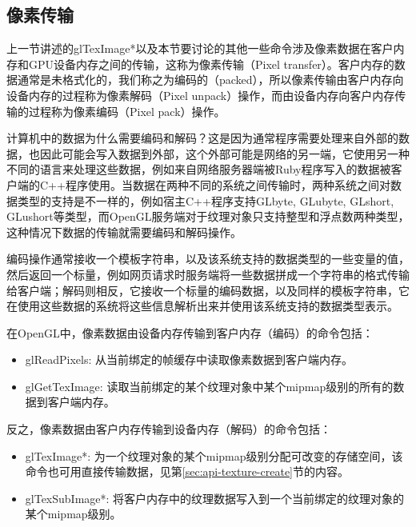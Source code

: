 \subsection{像素传输}
上一节讲述的glTexImage*以及本节要讨论的其他一些命令涉及像素数据在客户内存和GPU设备内存之间的传输，这称为像素传输（Pixel transfer）。客户内存的数据通常是未格式化的，我们称之为编码的（packed），所以像素传输由客户内存向设备内存的过程称为像素解码（Pixel unpack）操作，而由设备内存向客户内存传输的过程称为像素编码（Pixel pack）操作。

\begin{myshaded}
	计算机中的数据为什么需要编码和解码？这是因为通常程序需要处理来自外部的数据，也因此可能会写入数据到外部，这个外部可能是网络的另一端，它使用另一种不同的语言来处理这些数据，例如来自网络服务器端被Ruby程序写入的数据被客户端的C++程序使用。当数据在两种不同的系统之间传输时，两种系统之间对数据类型的支持是不一样的，例如宿主C++程序支持GLbyte, GLubyte, GLshort, GLushort等类型，而OpenGL服务端对于纹理对象只支持整型和浮点数两种类型，这种情况下数据的传输就需要编码和解码操作。
	
	编码操作通常接收一个模板字符串，以及该系统支持的数据类型的一些变量的值，然后返回一个标量，例如网页请求时服务端将一些数据拼成一个字符串的格式传输给客户端；解码则相反，它接收一个标量的编码数据，以及同样的模板字符串，它在使用这些数据的系统将这些信息解析出来并使用该系统支持的数据类型表示。
\end{myshaded}

在OpenGL中，像素数据由设备内存传输到客户内存（编码）的命令包括：

\begin{itemize}
	\item glReadPixels: 从当前绑定的帧缓存中读取像素数据到客户端内存。
	\item glGetTexImage: 读取当前绑定的某个纹理对象中某个mipmap级别的所有的数据到客户端内存。
\end{itemize}

反之，像素数据由客户内存传输到设备内存（解码）的命令包括：

\begin{itemize}
	\item glTexImage*: 为一个纹理对象的某个mipmap级别分配可改变的存储空间，该命令也可用直接传输数据，见第\ref{sec:api-texture-create}节的内容。
	\item glTexSubImage*: 将客户内存中的纹理数据写入到一个当前绑定的纹理对象的某个mipmap级别。
\end{itemize}

